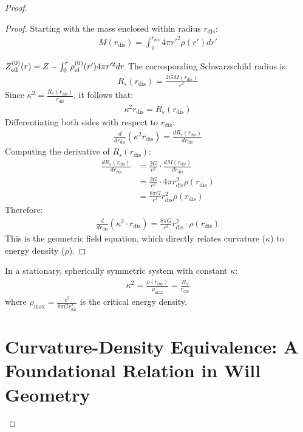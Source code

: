 \documentclass{article}
\begin{document}
\begin{theorem}
\begin{proof}
\begin{proof}
Starting with the mass enclosed within radius $r_{\text{dis}}$:
\begin{align}
M(r_{\text{dis}}) = \int_0^{r_{\text{dis}}} 4\pi r'^2 \rho(r')dr'
\end{align}


$Z_{\rm eff}^{(0)}(r)
=Z-\int_0^r \rho_{\rm el}^{(0)}(r')4\pi r'^2dr$
The corresponding Schwarzschild radius is:
\begin{align}
R_s(r_{\text{dis}}) = \frac{2GM(r_{\text{dis}})}{c^2}
\end{align}
Since $\kappa^2 = \frac{R_s(r_{\text{dis}})}{r_{\text{dis}}}$, it follows that:
\begin{align}
\kappa^2 r_{\text{dis}} = R_s(r_{\text{dis}})
\end{align}
Differentiating both sides with respect to $r_{\text{dis}}$:
\begin{align}
\frac{d}{dr_{\text{dis}}}(\kappa^2 r_{\text{dis}}) = \frac{dR_s(r_{\text{dis}})}{dr_{\text{dis}}}
\end{align}
Computing the derivative of $R_s(r_{\text{dis}})$:
\begin{align}
\frac{dR_s(r_{\text{dis}})}{dr_{\text{dis}}} &= \frac{2G}{c^2} \cdot \frac{dM(r_{\text{dis}})}{dr_{\text{dis}}} \\
&= \frac{2G}{c^2} \cdot 4\pi r_{\text{dis}}^2 \rho(r_{\text{dis}}) \\
&= \frac{8\pi G}{c^2}r_{\text{dis}}^2 \rho(r_{\text{dis}})
\end{align}
Therefore:
\begin{align}
\frac{d}{dr_{\text{dis}}}(\kappa^2 \cdot r_{\text{dis}}) = \frac{8\pi G}{c^2}r_{\text{dis}}^2 \cdot \rho(r_{\text{dis}})
\end{align}
This is the geometric field equation, which directly relates curvature ($\kappa$) to energy density ($\rho$).
\end{proof}

\begin{corollary}
In a stationary, spherically symmetric system with constant $\kappa$:
\begin{align}
\kappa^2 = \frac{\rho(r_{\text{dis}})}{\rho_{\text{max}}} = \frac{R_s}{r_{\text{dis}}}
\end{align}
where $\rho_{\text{max}} = \frac{c^2}{8\pi G r_{\text{dis}}^2}$ is the critical energy density.
\end{corollary}

\section{Curvature-Density Equivalence: A Foundational Relation in Will Geometry}


\end{proof}
\end{theorem}
\end{document}
